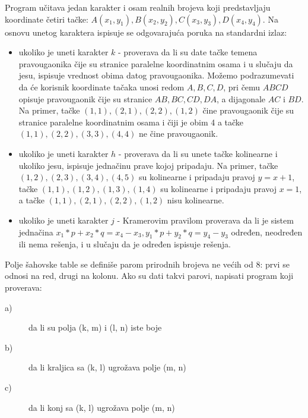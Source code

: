 \begin{Exercise}[difficulty=1, label=v1.2_14] 
Program učitava jedan karakter i osam realnih brojeva koji predstavljaju 
koordinate četiri tačke: $A(x_1, y_1), B(x_2, y_2), C(x_3, y_3), D(x_4, y_4)$. Na osnovu unetog karaktera 
ispisuje se odgovarajuća poruka na standardni izlaz:
\begin{itemize}
\item ukoliko je uneti karakter $k$ - proverava da li su date tačke temena pravougaonika čije su stranice paralelne koordinatnim osama i 
    u slučaju da jesu, ispisuje vrednost obima datog pravougaonika. Možemo podrazumevati da će korisnik koordinate tačaka 
    unosi redom $A,B,C,D$, pri čemu $ABCD$ opisuje pravougaonik čije su stranice $AB,BC,CD,DA$, a dijagonale $AC$ i $BD$. 
    Na primer, tačke $(1,1),(2,1),(2,2),(1,2)$ čine pravougaonik čije su stranice paralelne koordinatnim osama i čiji je obim 4
    a tačke $(1,1),(2,2),(3,3),(4,4)$ ne čine pravougaonik. 
\item ukoliko je uneti karakter $h$ - proverava da li su unete tačke kolinearne i ukoliko jesu, ispisuje jednačinu prave kojoj pripadaju. 
    Na primer, tačke $(1,2),(2,3),(3,4),(4,5)$ su kolinearne i pripadaju pravoj $y=x+1$, 
    tačke $(1,1),(1,2),(1,3),(1,4)$ su kolinearne i pripadaju pravoj $x=1$,
    a tačke $(1,1),(2,1),(2,2),(1,2)$ nisu kolinearne.
\item ukoliko je uneti karakter $j$ - Kramerovim pravilom proverava da li je sistem jednačina
$x_1 * p + x_2 * q = x_4 - x_3,y_1 * p + y_2 * q = y_4 - y_3$
    određen, neodređen ili nema rešenja, i u slučaju da je određen ispisuje rešenja.
\end{itemize} 
\end{Exercise}
\begin{Answer}[ref=v1.2_14]
\end{Answer}


\begin{Exercise}[label=p1_21]
Polje šahovske table se definiše parom prirodnih brojeva ne većih od $8$: prvi se odnosi na red, drugi na kolonu. Ako su dati takvi
parovi, napisati program koji proverava: \\
\begin{description}
\item[a)] da li su polja (k, m) i (l, n) iste boje
\item[b)] da li kraljica sa (k, l) ugrožava polje (m, n)
\item[c)] da li konj sa (k, l) ugrožava polje (m, n)
\end{description}

\end{Exercise}




